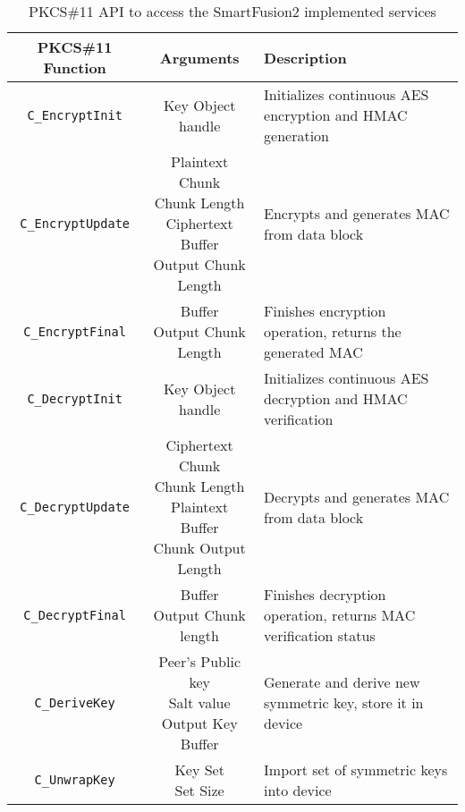 \begin{table}[]
\centering
\def\arraystretch{1.5}
	\begin{tabular}{|c|c|l|}
	\hline
	\textbf{PKCS\#11 Function} & \textbf{Arguments} & \textbf{Description} \\ \hline
	\texttt{C\_EncryptInit}		& Key Object handle & Initializes continuous AES encryption and HMAC generation \\ \hline
	\texttt{C\_EncryptUpdate}	& \makecell{Plaintext Chunk\\Chunk Length\\Ciphertext Buffer\\Output Chunk Length} & Encrypts and generates MAC from data block \\ \hline
	\texttt{C\_EncryptFinal}	& \makecell{Buffer\\Output Chunk Length} & Finishes encryption operation, returns the generated MAC\\ \hline
	\texttt{C\_DecryptInit}		& Key Object handle & Initializes continuous AES decryption and HMAC verification\\ \hline
	\texttt{C\_DecryptUpdate}	& \makecell{Ciphertext Chunk\\Chunk Length\\Plaintext Buffer\\Chunk Output Length} & Decrypts and generates MAC from data block\\ \hline
	\texttt{C\_DecryptFinal}	& \makecell{Buffer\\Output Chunk length} & Finishes decryption operation, returns MAC verification status\\ \hline
	\texttt{C\_DeriveKey}		& \makecell{Peer's Public key\\Salt value\\Output Key Buffer} & Generate and derive new symmetric key, store it in device \\ \hline
	\texttt{C\_UnwrapKey}		& \makecell{Key Set\\Set Size} & Import set of symmetric keys into device\\ \hline
\end{tabular}
\caption{PKCS\#11 API to access the SmartFusion2 implemented services}
\label{tab:pkcs11-api}
\end{table}
